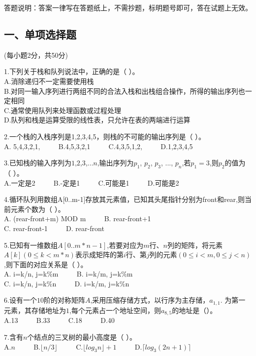 
答题说明：答案一律写在答题纸上，不需抄题，标明题号即可，答在试题上无效。

\subsection{一、单项选择题}
(每小题2分，共50分)

1.下列关于栈和队列说法中，正确的是（    ）。 \\
A.消除递归不一定需要使用栈 \\
B.对同一输入序列进行两组不同的合法入栈和出栈组合操作，所得的输出序列也一定相同 \\
C.通常使用队列来处理函数或过程处理 \\
D.队列和栈是运算受限的线性表，只允许在表的两端进行运算

2.一个栈的入栈序列是1,2,3,4,5，则栈的不可能的输出序列是（ ）。 \\
A. 5,4,3,2,1,  $\qquad$ B.4,5,3,2,1 $\qquad$ C.4,3,5,1,2, $\qquad$ D.1,2,3,4,5

3.已知栈的输入序列为$1$,$2$,$3$,...$n$,输出序列为$p_1$, $p_2$, $p_3$, ..., $p_n$,若$p_1=3$,则$p_2$的值为（    ）。 \\
A.一定是2 $\qquad$ B.-定是1 $\qquad$ C.可能是1 $\qquad$ D.可能是2

4.循环队列用数组A[0..m-1]存放其元素值，已知其头尾指针分别为front和rear,则当前元素个数为（ ）。 \\
A. (rear-front+m) MOD m $\qquad$ B. rear-front+1 \\
C. rear-front-1 $\qquad$ D. rear-front

5.已知有一维数组$A[0..m*n-1]$,若要对应为$m$行、$n$列的矩阵，将元素$A[k](0\leqslant k<m*n)$表示成矩阵的第$i$行、第$j$列的元素$(0\leqslant i<m, 0\leqslant j<n)$,则下面的对应关系是（    ）。 \\
A. i=k/n, j=k\%m $\qquad$ B. i=k/m, j=k\%m \\
C. i=k/n, j=k\%n $\qquad$ D. i=k/m, j=k\%n

6.设有一个$10$阶的对称矩阵$A$,采用压缩存储方式，以行序为主存储，$a_{1,1}$. 为第一元素，其存储地址为$1$,每个元素占一个地址空间，则$a_{8,5}$的地址是（）。 \\
A.13 $\qquad$ B.33 $\qquad$ C.18 $\qquad$ D.40

7.含有$n$个结点的三叉树的最小高度是（    ）。 \\
A.$n$ $\qquad$ B.$\lfloor n/3 \rfloor$ $\qquad$ C.$\lfloor log_3n\rfloor+1$ $\qquad$ D.$\lceil log_3(2n+1)\rceil$

